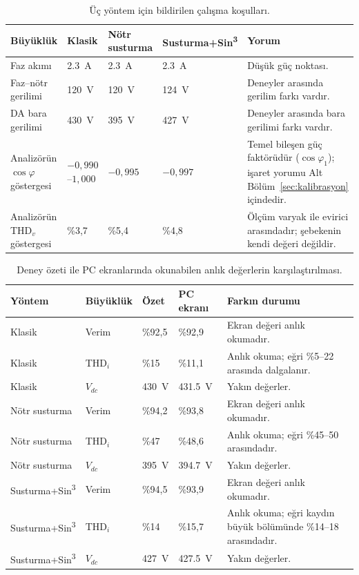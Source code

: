 \begin{table}[H]
  \centering
  \caption{Üç yöntem için bildirilen çalışma koşulları.}
  \label{tab:deney-kosullari}
  \footnotesize
  \begin{tabularx}{\textwidth}{p{} *{3}{>{\centering\arraybackslash}X} X}
    \toprule
    Büyüklük & Klasik & Nötr susturma & Susturma+Sin\textsuperscript{3} & Yorum \\
    \midrule
    Faz akımı & \SI{2.3}{\ampere} & \SI{2.3}{\ampere} & \SI{2.3}{\ampere} & Düşük güç noktası. \\
    Faz--nötr gerilimi & \SI{120}{\volt} & \SI{120}{\volt} & \SI{124}{\volt} & Deneyler arasında gerilim farkı vardır. \\
    DA bara gerilimi & \SI{430}{\volt} & \SI{395}{\volt} & \SI{427}{\volt} & Deneyler arasında bara gerilimi farkı vardır. \\
    Analizörün $\cos\varphi$ göstergesi & $-0{,}990$--$1{,}000$ & $-0{,}995$ & $-0{,}997$ & Temel bileşen güç faktörüdür ($\cos\varphi_1$); işaret yorumu Alt Bölüm~\ref{sec:kalibrasyon} içindedir. \\
    Analizörün THD$_v$ göstergesi & \%3,7 & \%5,4 & \%4,8 & Ölçüm varyak ile evirici arasındadır; şebekenin kendi değeri değildir. \\
    \bottomrule
  \end{tabularx}
\end{table}

\begin{table}[H]
  \centering
  \caption{Deney özeti ile PC ekranlarında okunabilen anlık değerlerin karşılaştırılması.}
  \label{tab:deney-metin-ekran-karsilastirma}
  \footnotesize
  \begin{tabularx}{\textwidth}{p{} p{} >{\centering\arraybackslash}X >{\centering\arraybackslash}X X}
    \toprule
    Yöntem & Büyüklük & Özet & PC ekranı & Farkın durumu \\
    \midrule
    Klasik & Verim & \%92,5 & \%92,9 & Ekran değeri anlık okumadır. \\
    Klasik & THD$_i$ & \%15 & \%11,1 & Anlık okuma; eğri \%5--22 arasında dalgalanır. \\
    Klasik & $V_{dc}$ & \SI{430}{\volt} & \SI{431.5}{\volt} & Yakın değerler. \\
    \midrule
    Nötr susturma & Verim & \%94,2 & \%93,8 & Ekran değeri anlık okumadır. \\
    Nötr susturma & THD$_i$ & \%47 & \%48,6 & Anlık okuma; eğri \%45--50 arasındadır. \\
    Nötr susturma & $V_{dc}$ & \SI{395}{\volt} & \SI{394.7}{\volt} & Yakın değerler. \\
    \midrule
    Susturma+Sin\textsuperscript{3} & Verim & \%94,5 & \%93,9 & Ekran değeri anlık okumadır. \\
    Susturma+Sin\textsuperscript{3} & THD$_i$ & \%14 & \%15,7 & Anlık okuma; eğri kaydın büyük bölümünde \%14--18 arasındadır. \\
    Susturma+Sin\textsuperscript{3} & $V_{dc}$ & \SI{427}{\volt} & \SI{427.5}{\volt} & Yakın değerler. \\
    \bottomrule
  \end{tabularx}
\end{table}

